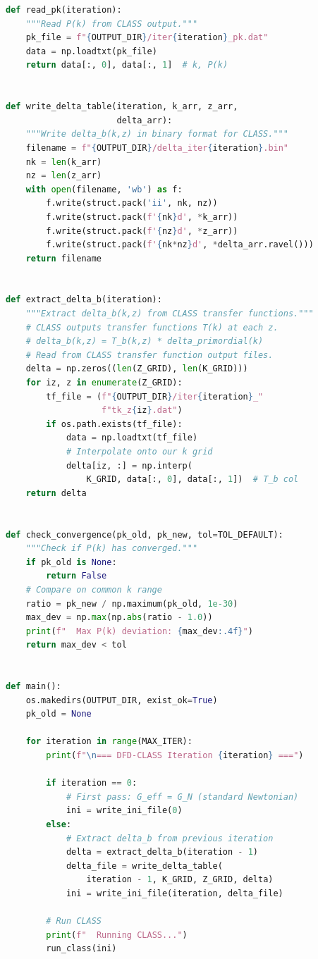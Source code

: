 \documentclass[11pt]{article}
\theoremstyle{definition}
\theoremstyle{remark}
\begin{document}
\begin{lstlisting}[language=Python,
  caption={iterate\_dfd.py --- Complete iteration wrapper},
  label={lst:python}]
def read_pk(iteration):
    """Read P(k) from CLASS output."""
    pk_file = f"{OUTPUT_DIR}/iter{iteration}_pk.dat"
    data = np.loadtxt(pk_file)
    return data[:, 0], data[:, 1]  # k, P(k)


def write_delta_table(iteration, k_arr, z_arr,
                      delta_arr):
    """Write delta_b(k,z) in binary format for CLASS."""
    filename = f"{OUTPUT_DIR}/delta_iter{iteration}.bin"
    nk = len(k_arr)
    nz = len(z_arr)
    with open(filename, 'wb') as f:
        f.write(struct.pack('ii', nk, nz))
        f.write(struct.pack(f'{nk}d', *k_arr))
        f.write(struct.pack(f'{nz}d', *z_arr))
        f.write(struct.pack(f'{nk*nz}d', *delta_arr.ravel()))
    return filename


def extract_delta_b(iteration):
    """Extract delta_b(k,z) from CLASS transfer functions."""
    # CLASS outputs transfer functions T(k) at each z.
    # delta_b(k,z) = T_b(k,z) * delta_primordial(k)
    # Read from CLASS transfer function output files.
    delta = np.zeros((len(Z_GRID), len(K_GRID)))
    for iz, z in enumerate(Z_GRID):
        tf_file = (f"{OUTPUT_DIR}/iter{iteration}_"
                   f"tk_z{iz}.dat")
        if os.path.exists(tf_file):
            data = np.loadtxt(tf_file)
            # Interpolate onto our k grid
            delta[iz, :] = np.interp(
                K_GRID, data[:, 0], data[:, 1])  # T_b col
    return delta


def check_convergence(pk_old, pk_new, tol=TOL_DEFAULT):
    """Check if P(k) has converged."""
    if pk_old is None:
        return False
    # Compare on common k range
    ratio = pk_new / np.maximum(pk_old, 1e-30)
    max_dev = np.max(np.abs(ratio - 1.0))
    print(f"  Max P(k) deviation: {max_dev:.4f}")
    return max_dev < tol


def main():
    os.makedirs(OUTPUT_DIR, exist_ok=True)
    pk_old = None

    for iteration in range(MAX_ITER):
        print(f"\n=== DFD-CLASS Iteration {iteration} ===")

        if iteration == 0:
            # First pass: G_eff = G_N (standard Newtonian)
            ini = write_ini_file(0)
        else:
            # Extract delta_b from previous iteration
            delta = extract_delta_b(iteration - 1)
            delta_file = write_delta_table(
                iteration - 1, K_GRID, Z_GRID, delta)
            ini = write_ini_file(iteration, delta_file)

        # Run CLASS
        print(f"  Running CLASS...")
        run_class(ini)


\end{lstlisting}
\end{document}
